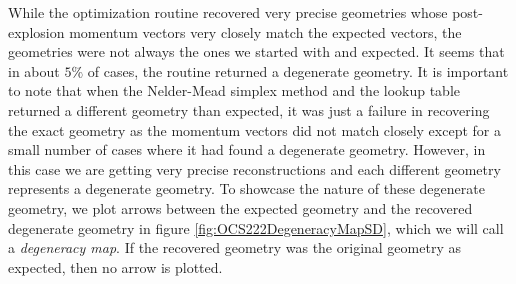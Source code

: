 While the optimization routine recovered very precise geometries whose post-explosion momentum vectors very closely match the expected vectors, the geometries were not always the ones we started with and expected. It seems that in about $5\%$ of cases, the routine returned a degenerate geometry. It is important to note that when the Nelder-Mead simplex method and the lookup table returned a different geometry than expected, it was just a failure in recovering the exact geometry as the momentum vectors did not match closely except for a small number of cases where it had found a degenerate geometry. However, in this case we are getting very precise reconstructions and each different geometry represents a degenerate geometry. To showcase the nature of these degenerate geometry, we plot arrows between the expected geometry and the recovered degenerate geometry in figure \ref{fig:OCS222DegeneracyMapSD}, which we will call a \emph{degeneracy map}. If the recovered geometry was the original geometry as expected, then no arrow is plotted.


